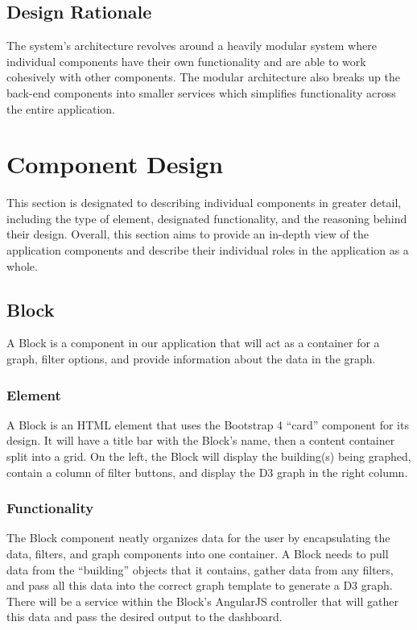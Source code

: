 \documentclass[journal,10pt,onecolumn,compsoc]{IEEEtran}
\begin{document}

    \subsection{Design Rationale}
    The system's architecture revolves around a heavily modular system where individual components have their own functionality and are able to work cohesively with other components. The modular architecture also breaks up the back-end components into smaller services which simplifies functionality across the entire application.
    
    \section{Component Design}
    This section is designated to describing individual components in greater detail, including the type of element, designated functionality, and the reasoning behind their design. 
	Overall, this section aims to provide an in-depth view of the application components and describe their individual roles in the application as a whole.
		\subsection{Block}
			A Block is a component in our application that will act as a container for a graph, filter options, and provide information about the data in the graph.
			\subsubsection{Element} 
				A Block is an HTML element that uses the Bootstrap 4 ``card'' component for its design. It will have a title bar with the Block's name, then a content container split into a grid. 
				On the left, the Block will display the building(s) being graphed, contain a column of filter buttons, and display the D3 graph in the right column. 
			\subsubsection{Functionality}
				The Block component neatly organizes data for the user by encapsulating the data, filters, and graph components into one container. 
				A Block needs to pull data from the ``building'' objects that it contains, gather data from any filters, and pass all this data into the correct graph template to generate a D3 graph. 
				There will be a service within the Block's AngularJS controller that will gather this data and pass the desired output to the dashboard.
\end{document}
